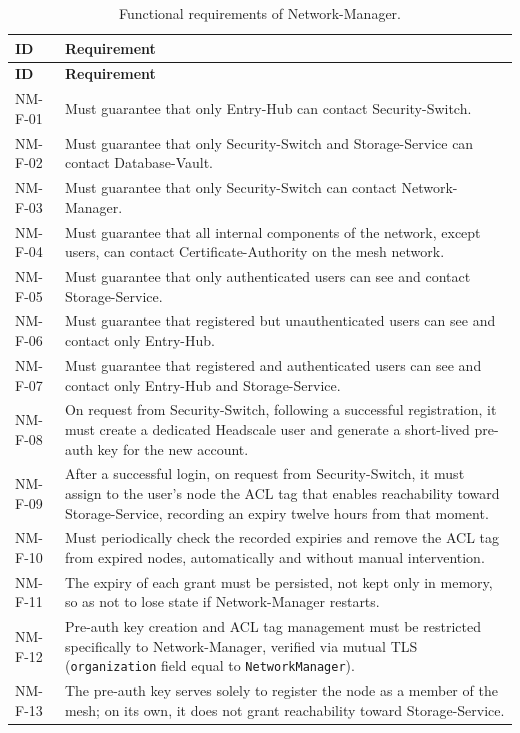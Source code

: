 \begin{longtable}{p{2.6cm} p{\dimexpr\linewidth-2.6cm-4\tabcolsep\relax}}
\caption{Functional requirements of Network-Manager.} \\
\hline
\textbf{ID} & \textbf{Requirement} \\
\hline
\endfirsthead
\hline
\textbf{ID} & \textbf{Requirement} \\
\hline
\endhead
\hline
\endfoot
\hline
\endlastfoot
NM-F-01 & Must guarantee that only Entry-Hub can contact Security-Switch. \\
NM-F-02 & Must guarantee that only Security-Switch and Storage-Service can contact Database-Vault. \\
NM-F-03 & Must guarantee that only Security-Switch can contact Network-Manager. \\
NM-F-04 & Must guarantee that all internal components of the network, except users, can contact Certificate-Authority on the mesh network. \\
NM-F-05 & Must guarantee that only authenticated users can see and contact Storage-Service. \\
NM-F-06 & Must guarantee that registered but unauthenticated users can see and contact only Entry-Hub. \\
NM-F-07 & Must guarantee that registered and authenticated users can see and contact only Entry-Hub and Storage-Service. \\
NM-F-08 & On request from Security-Switch, following a successful registration, it must create a dedicated Headscale user and generate a short-lived pre-auth key for the new account. \\
NM-F-09 & After a successful login, on request from Security-Switch, it must assign to the user's node the ACL tag that enables reachability toward Storage-Service, recording an expiry twelve hours from that moment. \\
NM-F-10 & Must periodically check the recorded expiries and remove the ACL tag from expired nodes, automatically and without manual intervention. \\
NM-F-11 & The expiry of each grant must be persisted, not kept only in memory, so as not to lose state if Network-Manager restarts. \\
NM-F-12 & Pre-auth key creation and ACL tag management must be restricted specifically to Network-Manager, verified via mutual TLS (\texttt{organization} field equal to \texttt{NetworkManager}). \\
NM-F-13 & The pre-auth key serves solely to register the node as a member of the mesh; on its own, it does not grant reachability toward Storage-Service. \\

\end{longtable}
